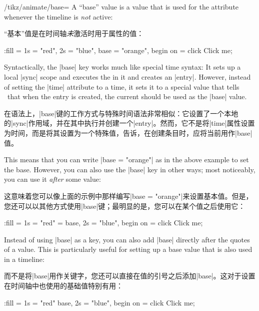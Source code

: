 \begin{key}{/tikz/animate/base=}
    A ``base'' value is a value that is used for the attribute whenever the
    timeline is \emph{not} active:
    
    “基本”值是在时间轴\emph{未}激活时用于属性的值：


\begin{codeexample}[
    preamble={\usetikzlibrary{animations}},
    animation list = {0.5,1,1.5,2,2.5},
]
\tikz \node [fill = green, text = white] :fill =
    { 1s = "red", 2s = "blue", base = "orange", begin on = click }
  {Click me};
\end{codeexample}

    Syntactically, the |base| key works much like special time syntax: It sets
    up a local |sync| scope and executes the  in it and creates
    an |entry|. However, instead of setting the |time| attribute to a time, it
    sets it to a special value that tells \tikzname\ that when the entry is
    created, the current  should be used as the |base| value.

    在语法上，|base|键的工作方式与特殊时间语法非常相似：它设置了一个本地的|sync|作用域，并在其中执行并创建一个|entry|。然而，它不是将|time|属性设置为时间，而是将其设置为一个特殊值，告诉\tikzname，在创建条目时，应将当前用作|base|值。

    This means that you can write |base = "orange"| as in the above example to
    set the base. However, you can also use the |base| key in other ways; most
    noticeably, you can use it \emph{after} some value:
    
    这意味着您可以像上面的示例中那样编写|base = "orange"|来设置基本值。但是，您还可以以其他方式使用|base|键；最明显的是，您可以在某个值之后使用它：


\begin{codeexample}[
    preamble={\usetikzlibrary{animations}},
    animation list = {0.5,1,1.5,2,2.5},
]
\tikz \node [fill = green, text = white] :fill =
    { 1s = {"red" = base}, 2s = "blue", begin on = click }
  {Click me};
\end{codeexample}

    Instead of using |base| as a key, you can also add |base| directly after
    the quotes of a value. This is particularly useful for setting up a base
    value that is also used in a timeline:
    
    而不是将|base|用作关键字，您还可以直接在值的引号之后添加|base|。这对于设置在时间轴中也使用的基础值特别有用：


\begin{codeexample}[
    preamble={\usetikzlibrary{animations}},
    animation list = {0.5,1,1.5,2,2.5},
]
\tikz \node [fill = green, text = white] :fill =
    { 1s = "red" base, 2s = "blue", begin on = click }
  {Click me};
\end{codeexample}
\end{key}

